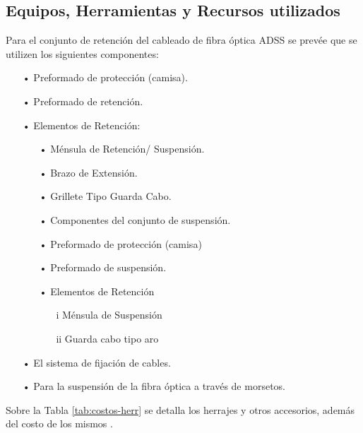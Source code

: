 

\subsection{Equipos, Herramientas y Recursos utilizados}


Para el conjunto de retención del cableado de fibra óptica ADSS se prevée que se utilizen los siguientes componentes:

\begin{itemize}
\item[•]Preformado de protección (camisa).
\item[•]Preformado de retención.
\item[•] Elementos de Retención:

\begin{itemize}
\item[•]Ménsula de Retención/ Suspensión.
\item[•]Brazo de Extensión.
\item[•]Grillete Tipo Guarda Cabo.
\item[•]Componentes del conjunto de suspensión.
\item[•]Preformado de protección (camisa)
\item[•]Preformado de suspensión.
\item[•]Elementos de Retención
\begin{itemize}
\item[i]Ménsula de Suspensión
\item[ii]Guarda cabo tipo aro
\end{itemize}

\end{itemize}

\item[•]El sistema de fijación de cables.
\item[•]Para la suspensión de la fibra óptica a través de morsetos.


\end{itemize}



Sobre la Tabla \ref{tab:costos-herr}  se detalla los herrajes y otros accesorios, además del costo de los mismos \cite{costosherr}.%




